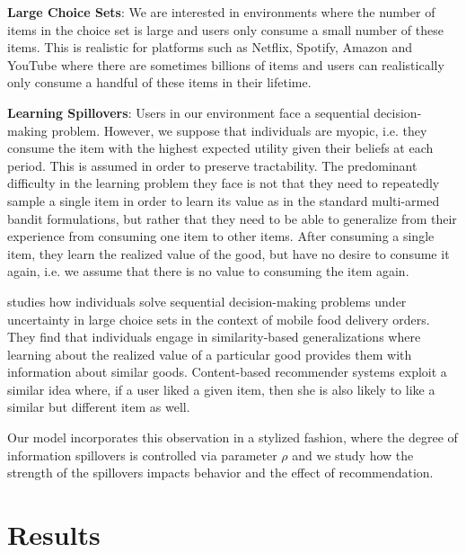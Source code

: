 \documentclass[sigconf]{acmart}
\begin{document}
\noindent \textbf{Large Choice Sets}: We are interested in environments where the number of items in the choice set is large and users only consume a small number of these items. This is realistic for platforms such as Netflix, Spotify, Amazon and YouTube where there are sometimes billions of items and users can realistically only consume a handful of these items in their lifetime.\par

\noindent \textbf{Learning Spillovers}: Users in our environment face a sequential decision-making problem. However, we suppose that individuals are myopic, i.e. they consume the item with the highest expected utility given their beliefs at each period. This is assumed in order to preserve tractability. The predominant difficulty in the learning problem they face is not that they need to repeatedly sample a single item in order to learn its value as in the standard multi-armed bandit formulations, but rather that they need to be able to generalize from their experience from consuming one item to other items. After consuming a single item, they learn the realized value of the good, but have no desire to consume it again, i.e. we assume that there is no value to consuming the item again.
\par

\cite{schulz2019structured} studies how individuals solve sequential decision-making problems under uncertainty in large choice sets in the context of mobile food delivery orders. They find that individuals engage in similarity-based generalizations where learning about the realized value of a particular good provides them with information about similar goods. Content-based recommender systems exploit a similar idea where, if a user liked a given item, then she is also likely to like a similar but different item as well.
\par

Our model incorporates this observation in a stylized fashion, where the degree of information spillovers is controlled via parameter $\rho$ and we study how the strength of the spillovers impacts behavior and the effect of recommendation.
\par

\section{Results}
\end{document}
